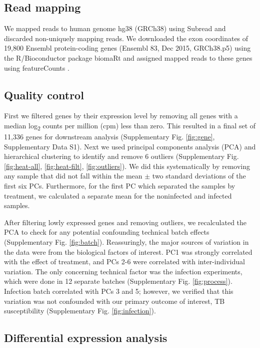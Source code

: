 \documentclass[fleqn,10pt]{wlscirep}
\begin{document}
\subsection*{Read mapping}

We mapped reads to human genome hg38 (GRCh38) using Subread
\cite{Liao2013} and discarded non-uniquely mapping reads. We
downloaded the exon coordinates of 19,800 Ensembl protein-coding genes
(Ensembl 83, Dec 2015, GRCh38.p5) using the R/Bioconductor
\cite{Huber2015} package biomaRt \cite{Durinck2005, Durinck2009} and
assigned mapped reads to these genes using featureCounts
\cite{Liao2014}.
\subsection*{Quality control}

First we filtered genes by their expression level by removing all
genes with a median log\textsubscript{2} counts per million (cpm) less
than zero. This resulted in a final set of 11,336 genes for downstream
analysis (Supplementary Fig. \ref{fig:gene}, Supplementary Data S1).
Next we used principal components analysis (PCA) and hierarchical
clustering to identify and remove 6 outliers (Supplementary Fig.
\ref{fig:heat-all}, \ref{fig:heat-filt}, \ref{fig:outliers}). We did
this systematically by removing any sample that did not fall within
the mean $\pm$ two standard deviations of the first six PCs.
Furthermore, for the first PC which separated the samples by
treatment, we calculated a separate mean for the noninfected and
infected samples.

After filtering lowly expressed genes and removing outliers, we
recalculated the PCA to check for any potential confounding technical
batch effects (Supplementary Fig. \ref{fig:batch}). Reassuringly, the
major sources of variation in the data were from the biological
factors of interest. PC1 was strongly correlated with the effect of
treatment, and PCs 2-6 were correlated with inter-individual
variation. The only concerning technical factor was the infection
experiments, which were done in 12 separate batches (Supplementary
Fig. \ref{fig:process}). Infection batch correlated with PCs 3 and 5;
however, we verified that this variation was not confounded with our
primary outcome of interest, TB susceptibility (Supplementary Fig.
\ref{fig:infection}).
\subsection*{Differential expression analysis}
\end{document}
